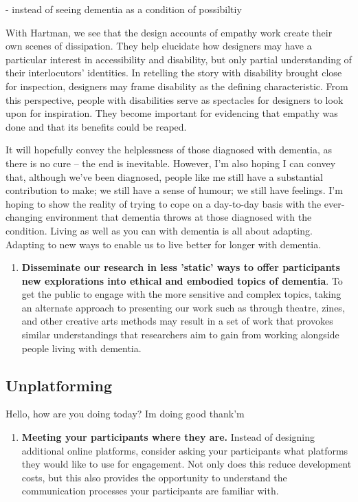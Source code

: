 - instead of seeing dementia as a condition of possibiltiy

With Hartman, we see that the design accounts of empathy work create their own scenes of dissipation. They help elucidate how designers may have a particular interest in accessibility and disability, but only partial understanding of their interlocutors’ identities. In retelling the story with disability brought close for inspection, designers may frame disability as the defining characteristic. From this perspective, people with disabilities serve as spectacles for designers to look upon for inspiration. They become important for evidencing that empathy was done and that its benefits could be reaped.


It will hopefully convey the helplessness of those diagnosed with dementia, as there is no cure – the end is inevitable. However, I’m also hoping I can convey that, although we’ve been diagnosed, people like me still have a substantial contribution to make; we still have a sense of humour; we still have feelings. I’m hoping to show the reality of trying to cope on a day-to-day basis with the ever-changing environment that dementia throws at those diagnosed with the condition. Living as well as you can with dementia is all about adapting. Adapting to new ways to enable us to live better for longer with dementia.




\begin{enumerate}
\item \textbf{Disseminate our research in less 'static' ways to offer participants new explorations into ethical and embodied topics of dementia}. To get the public to engage with the more sensitive and complex topics, taking an alternate approach to presenting our work such as through theatre, zines, and other creative arts methods may result in a set of work that provokes similar understandings that researchers aim to gain from working alongside people living with dementia.
\end{enumerate}

\subsection{Unplatforming}
Hello, how are you doing today? Im doing good thank'm

\begin{enumerate}[resume]
    \item \textbf{Meeting your participants where they are.} Instead of designing additional online platforms, consider asking your participants what platforms they would like to use for engagement. Not only does this reduce development costs, but this also provides the opportunity to understand the communication processes your participants are familiar with.
\end{enumerate}

